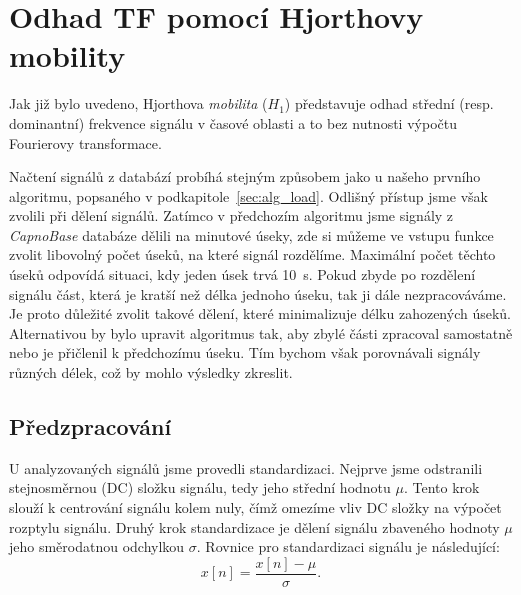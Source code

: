 \section{Odhad TF pomocí Hjorthovy mobility}
\label{sec:hjorth_mobilita_tf}
Jak již bylo uvedeno, Hjorthova \textit{mobilita} (\( H_1 \)) představuje odhad střední (resp. dominantní) frekvence signálu v časové oblasti a to bez nutnosti výpočtu Fourierovy transformace.

Načtení signálů z databází probíhá stejným způsobem jako u našeho prvního algoritmu, popsaného v podkapitole~\ref{sec:alg_load}.
Odlišný přístup jsme však zvolili při dělení signálů.
Zatímco v předchozím algoritmu jsme signály z \textit{CapnoBase} databáze dělili na minutové úseky, zde si můžeme ve vstupu funkce zvolit libovolný počet úseků, na které signál rozdělíme.
Maximální počet těchto úseků odpovídá situaci, kdy jeden úsek trvá 10~s.
Pokud zbyde po rozdělení signálu část, která je kratší než délka jednoho úseku, tak ji dále nezpracováváme.
Je proto důležité zvolit takové dělení, které minimalizuje délku zahozených úseků.
Alternativou by bylo upravit algoritmus tak, aby zbylé části zpracoval samostatně nebo je přičlenil k předchozímu úseku.
Tím bychom však porovnávali signály různých délek, což by mohlo výsledky zkreslit.

\subsection*{Předzpracování}
\label{sec:predzpracovani}
U analyzovaných signálů jsme provedli standardizaci.
Nejprve jsme odstranili stejnosměrnou (\acs{DC}) složku signálu, tedy jeho střední hodnotu \(\mu\).
Tento krok slouží k centrování signálu kolem nuly, čímž omezíme vliv \acs{DC} složky na výpočet rozptylu signálu.
Druhý krok standardizace je dělení signálu zbaveného hodnoty \(\mu\) jeho směrodatnou odchylkou \(\sigma\).
Rovnice pro standardizaci signálu je následující:
\begin{equation}
	\label{eq:standardizace}
	x[n] = \frac{x[n] - \mu}{\sigma}.
\end{equation}

